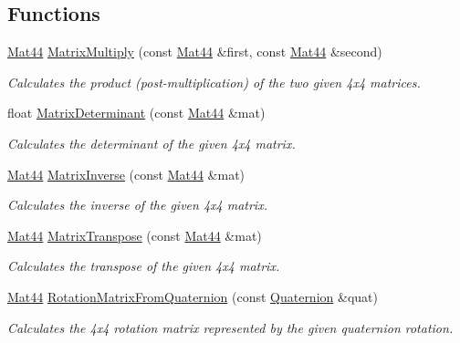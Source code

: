 \subsection*{Functions}
\begin{DoxyCompactItemize}
\item 
\hyperlink{classgfxmath_1_1_mat44}{Mat44} \hyperlink{namespacegfxmath_a4439d3f4590c372ada775196d1576f81}{Matrix\+Multiply} (const \hyperlink{classgfxmath_1_1_mat44}{Mat44} \&first, const \hyperlink{classgfxmath_1_1_mat44}{Mat44} \&second)
\begin{DoxyCompactList}\small\item\em Calculates the product (post-\/multiplication) of the two given 4x4 matrices. \end{DoxyCompactList}\item 
float \hyperlink{namespacegfxmath_a285829d964b38ad14730e85c325e775c}{Matrix\+Determinant} (const \hyperlink{classgfxmath_1_1_mat44}{Mat44} \&mat)
\begin{DoxyCompactList}\small\item\em Calculates the determinant of the given 4x4 matrix. \end{DoxyCompactList}\item 
\hyperlink{classgfxmath_1_1_mat44}{Mat44} \hyperlink{namespacegfxmath_a38c661c8ad19528520d36fabca7d555f}{Matrix\+Inverse} (const \hyperlink{classgfxmath_1_1_mat44}{Mat44} \&mat)
\begin{DoxyCompactList}\small\item\em Calculates the inverse of the given 4x4 matrix. \end{DoxyCompactList}\item 
\hyperlink{classgfxmath_1_1_mat44}{Mat44} \hyperlink{namespacegfxmath_a626e52b58fb763a90ba6e9d46966ee75}{Matrix\+Transpose} (const \hyperlink{classgfxmath_1_1_mat44}{Mat44} \&mat)
\begin{DoxyCompactList}\small\item\em Calculates the transpose of the given 4x4 matrix. \end{DoxyCompactList}\item 
\hyperlink{classgfxmath_1_1_mat44}{Mat44} \hyperlink{namespacegfxmath_ad7198c521a4d93e82694f39f0be736c9}{Rotation\+Matrix\+From\+Quaternion} (const \hyperlink{classgfxmath_1_1_quaternion}{Quaternion} \&quat)
\begin{DoxyCompactList}\small\item\em Calculates the 4x4 rotation matrix represented by the given quaternion rotation. \end{DoxyCompactList}\item 

\end{DoxyCompactItemize}
